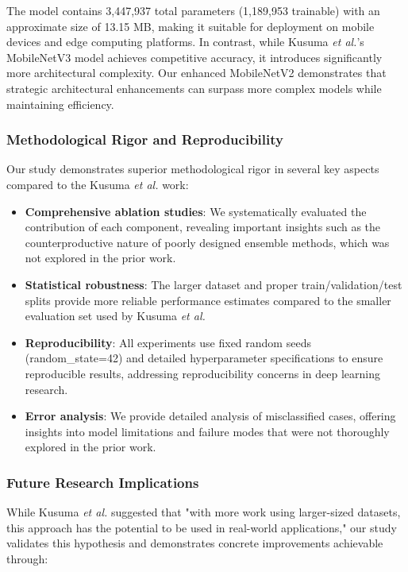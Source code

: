 \documentclass{article}
\begin{document}
The model contains 3,447,937 total parameters (1,189,953 trainable) with an approximate size of 13.15 MB, making it suitable for deployment on mobile devices and edge computing platforms. In contrast, while Kusuma \textit{et al.}'s MobileNetV3 model achieves competitive accuracy, it introduces significantly more architectural complexity. Our enhanced MobileNetV2 demonstrates that strategic architectural enhancements can surpass more complex models while maintaining efficiency.

\subsubsection{Methodological Rigor and Reproducibility}

Our study demonstrates superior methodological rigor in several key aspects compared to the Kusuma \textit{et al.} work:

\begin{itemize}
    \item \textbf{Comprehensive ablation studies}: We systematically evaluated the contribution of each component, revealing important insights such as the counterproductive nature of poorly designed ensemble methods, which was not explored in the prior work.
    
    \item \textbf{Statistical robustness}: The larger dataset and proper train/validation/test splits provide more reliable performance estimates compared to the smaller evaluation set used by Kusuma \textit{et al.}
    
    \item \textbf{Reproducibility}: All experiments use fixed random seeds (random\_state=42) and detailed hyperparameter specifications to ensure reproducible results, addressing reproducibility concerns in deep learning research.
    
    \item \textbf{Error analysis}: We provide detailed analysis of misclassified cases, offering insights into model limitations and failure modes that were not thoroughly explored in the prior work.
\end{itemize}

\subsubsection{Future Research Implications}

While Kusuma \textit{et al.} suggested that "with more work using larger-sized datasets, this approach has the potential to be used in real-world applications," our study validates this hypothesis and demonstrates concrete improvements achievable through:
\end{document}
